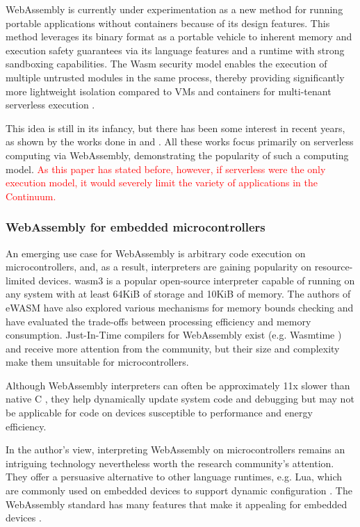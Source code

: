 WebAssembly is currently under experimentation as a new method for running portable applications without containers because of its design features. This method leverages its binary format as a portable vehicle to inherent memory and execution safety guarantees via its language features and a runtime with strong sandboxing capabilities. The Wasm security model enables the execution of multiple untrusted modules in the same process, thereby providing significantly more lightweight isolation compared to VMs and containers for multi-tenant serverless execution \cite{gadepalli2020sledge}.

This idea is still in its infancy, but there has been some interest in recent years, as shown by the works done in \cite{hall2019execution} and \cite{shillaker2020faasm}. All these works focus primarily on serverless computing via WebAssembly, demonstrating the popularity of such a computing model. \textcolor{red}{As this paper has stated before, however, if serverless were the only execution model, it would severely limit the variety of applications in the Continuum.}

\subsubsection{WebAssembly for embedded microcontrollers}

An emerging use case for WebAssembly is arbitrary code execution on microcontrollers, and, as a result, interpreters are gaining popularity on resource-limited devices. wasm3 \cite{wasm3} is a popular open-source interpreter capable of running on any system with at least 64KiB of storage and 10KiB of memory. The authors of eWASM \cite{peach2020ewasm} have also explored various mechanisms for memory bounds checking and have evaluated the trade-offs between processing efficiency and memory consumption. Just-In-Time compilers for WebAssembly exist (e.g. Wasmtime \cite{wasmtime}) and receive more attention from the community, but their size and complexity make them unsuitable for microcontrollers.

Although WebAssembly interpreters can often be approximately 11x slower than native C \cite{wasm3-performance}, they help dynamically update system code and debugging but may not be applicable for code on devices susceptible to performance and energy efficiency.

In the author's view, interpreting WebAssembly on microcontrollers remains an intriguing technology nevertheless worth the research community's attention. They offer a persuasive alternative to other language runtimes, e.g. Lua, which are commonly used on embedded devices to support dynamic configuration \cite{brzoza2016embedded}. The WebAssembly standard has many features that make it appealing for embedded devices \cite{peach2020ewasm}.

